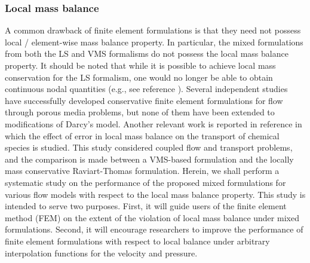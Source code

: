\documentclass[11pt,reqno]{amsart}
\begin{document}
\subsubsection{Local mass balance}
A common drawback of finite element formulations is 
that they need not possess local / element-wise mass 
balance property. In particular, the mixed formulations 
from both the LS and VMS formalisms do not possess the 
local mass balance property. It should be noted that while 
it is possible to achieve local mass conservation for the 
LS formalism, one would no longer be able to obtain continuous 
nodal quantities (e.g., see reference 
\cite{Bochev_Gunzburger_LocalConservative}). 
Several independent studies \cite{Petrov_Galerking_Darcy,
Local_conservative_Shuyu,Local_conservative_comparative} 
have successfully developed conservative finite element 
formulations for flow through porous media problems, but
none of them have been extended to modifications of 
Darcy's model. Another relevant work is reported in 
reference \cite{Turner_Nakshatrala_Subsurface} in 
which the effect of error in local mass balance on 
the transport of chemical species is studied. 
This study considered coupled flow and transport 
problems, and the comparison is made between a 
VMS-based formulation and the locally mass 
conservative Raviart-Thomas formulation. 
Herein, we shall perform a systematic study on the 
performance of the proposed mixed formulations for 
various flow models with respect to the local 
mass balance property. 
This study is intended to serve two purposes. First, 
it will guide users of the finite element method 
(FEM) on the extent of the violation of local mass balance 
under mixed formulations. Second, it will encourage 
researchers to improve the performance of finite 
element formulations with respect to local balance 
under arbitrary interpolation functions for the 
velocity and pressure. 
\end{document}
